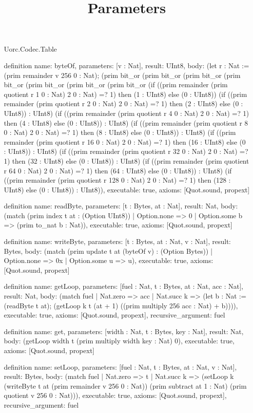 \begin{lexlean}{Uorc.Codec.Table}
\title{Parameters}
\begin{semanticmodule}
definition{
  name: byteOf,
  parameters: [v : Nat],
  result: UInt8,
  body: (let r : Nat := (prim remainder v 256 0 : Nat); (prim bit_or (prim bit_or (prim bit_or (prim bit_or (prim bit_or (prim bit_or (prim bit_or (if ((prim remainder (prim quotient r 1 0 : Nat) 2 0 : Nat) =? 1) then (1 : UInt8) else (0 : UInt8)) (if ((prim remainder (prim quotient r 2 0 : Nat) 2 0 : Nat) =? 1) then (2 : UInt8) else (0 : UInt8)) : UInt8) (if ((prim remainder (prim quotient r 4 0 : Nat) 2 0 : Nat) =? 1) then (4 : UInt8) else (0 : UInt8)) : UInt8) (if ((prim remainder (prim quotient r 8 0 : Nat) 2 0 : Nat) =? 1) then (8 : UInt8) else (0 : UInt8)) : UInt8) (if ((prim remainder (prim quotient r 16 0 : Nat) 2 0 : Nat) =? 1) then (16 : UInt8) else (0 : UInt8)) : UInt8) (if ((prim remainder (prim quotient r 32 0 : Nat) 2 0 : Nat) =? 1) then (32 : UInt8) else (0 : UInt8)) : UInt8) (if ((prim remainder (prim quotient r 64 0 : Nat) 2 0 : Nat) =? 1) then (64 : UInt8) else (0 : UInt8)) : UInt8) (if ((prim remainder (prim quotient r 128 0 : Nat) 2 0 : Nat) =? 1) then (128 : UInt8) else (0 : UInt8)) : UInt8)),
  executable: true,
  axioms: [Quot.sound, propext]
}

definition{
  name: readByte,
  parameters: [t : Bytes, at : Nat],
  result: Nat,
  body: (match (prim index t at : (Option UInt8))
    | Option.none => 0
    | Option.some b => (prim to_nat b : Nat)),
  executable: true,
  axioms: [Quot.sound, propext]
}

definition{
  name: writeByte,
  parameters: [t : Bytes, at : Nat, v : Nat],
  result: Bytes,
  body: (match (prim update t at (byteOf v) : (Option Bytes))
    | Option.none => 0x
    | Option.some u => u),
  executable: true,
  axioms: [Quot.sound, propext]
}

definition{
  name: getLoop,
  parameters: [fuel : Nat, t : Bytes, at : Nat, acc : Nat],
  result: Nat,
  body: (match fuel
    | Nat.zero => acc
    | Nat.succ k => (let b : Nat := (readByte t at); (getLoop k t (at + 1) ((prim multiply 256 acc : Nat) + b)))),
  executable: true,
  axioms: [Quot.sound, propext],
  recursive_argument: fuel
}

definition{
  name: get,
  parameters: [width : Nat, t : Bytes, key : Nat],
  result: Nat,
  body: (getLoop width t (prim multiply width key : Nat) 0),
  executable: true,
  axioms: [Quot.sound, propext]
}

definition{
  name: setLoop,
  parameters: [fuel : Nat, t : Bytes, at : Nat, v : Nat],
  result: Bytes,
  body: (match fuel
    | Nat.zero => t
    | Nat.succ k => (setLoop k (writeByte t at (prim remainder v 256 0 : Nat)) (prim subtract at 1 : Nat) (prim quotient v 256 0 : Nat))),
  executable: true,
  axioms: [Quot.sound, propext],
  recursive_argument: fuel
}


\end{semanticmodule}
\end{lexlean}
